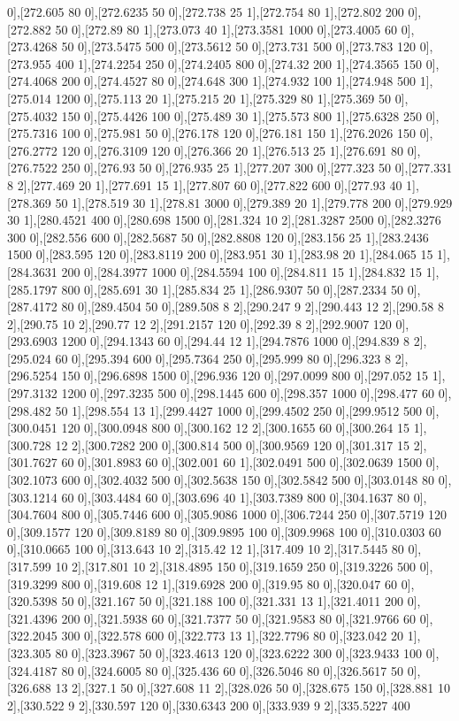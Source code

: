 {0],[272.605 80 0],[272.6235 50 0],[272.738 25 1],[272.754 80 1],[272.802 200 0],[272.882 50 0],[272.89 80 1],[273.073 40 1],[273.3581 1000 0],[273.4005 60 0],[273.4268 50 0],[273.5475 500 0],[273.5612 50 0],[273.731 500 0],[273.783 120 0],[273.955 400 1],[274.2254 250 0],[274.2405 800 0],[274.32 200 1],[274.3565 150 0],[274.4068 200 0],[274.4527 80 0],[274.648 300 1],[274.932 100 1],[274.948 500 1],[275.014 1200 0],[275.113 20 1],[275.215 20 1],[275.329 80 1],[275.369 50 0],[275.4032 150 0],[275.4426 100 0],[275.489 30 1],[275.573 800 1],[275.6328 250 0],[275.7316 100 0],[275.981 50 0],[276.178 120 0],[276.181 150 1],[276.2026 150 0],[276.2772 120 0],[276.3109 120 0],[276.366 20 1],[276.513 25 1],[276.691 80 0],[276.7522 250 0],[276.93 50 0],[276.935 25 1],[277.207 300 0],[277.323 50 0],[277.331 8 2],[277.469 20 1],[277.691 15 1],[277.807 60 0],[277.822 600 0],[277.93 40 1],[278.369 50 1],[278.519 30 1],[278.81 3000 0],[279.389 20 1],[279.778 200 0],[279.929 30 1],[280.4521 400 0],[280.698 1500 0],[281.324 10 2],[281.3287 2500 0],[282.3276 300 0],[282.556 600 0],[282.5687 50 0],[282.8808 120 0],[283.156 25 1],[283.2436 1500 0],[283.595 120 0],[283.8119 200 0],[283.951 30 1],[283.98 20 1],[284.065 15 1],[284.3631 200 0],[284.3977 1000 0],[284.5594 100 0],[284.811 15 1],[284.832 15 1],[285.1797 800 0],[285.691 30 1],[285.834 25 1],[286.9307 50 0],[287.2334 50 0],[287.4172 80 0],[289.4504 50 0],[289.508 8 2],[290.247 9 2],[290.443 12 2],[290.58 8 2],[290.75 10 2],[290.77 12 2],[291.2157 120 0],[292.39 8 2],[292.9007 120 0],[293.6903 1200 0],[294.1343 60 0],[294.44 12 1],[294.7876 1000 0],[294.839 8 2],[295.024 60 0],[295.394 600 0],[295.7364 250 0],[295.999 80 0],[296.323 8 2],[296.5254 150 0],[296.6898 1500 0],[296.936 120 0],[297.0099 800 0],[297.052 15 1],[297.3132 1200 0],[297.3235 500 0],[298.1445 600 0],[298.357 1000 0],[298.477 60 0],[298.482 50 1],[298.554 13 1],[299.4427 1000 0],[299.4502 250 0],[299.9512 500 0],[300.0451 120 0],[300.0948 800 0],[300.162 12 2],[300.1655 60 0],[300.264 15 1],[300.728 12 2],[300.7282 200 0],[300.814 500 0],[300.9569 120 0],[301.317 15 2],[301.7627 60 0],[301.8983 60 0],[302.001 60 1],[302.0491 500 0],[302.0639 1500 0],[302.1073 600 0],[302.4032 500 0],[302.5638 150 0],[302.5842 500 0],[303.0148 80 0],[303.1214 60 0],[303.4484 60 0],[303.696 40 1],[303.7389 800 0],[304.1637 80 0],[304.7604 800 0],[305.7446 600 0],[305.9086 1000 0],[306.7244 250 0],[307.5719 120 0],[309.1577 120 0],[309.8189 80 0],[309.9895 100 0],[309.9968 100 0],[310.0303 60 0],[310.0665 100 0],[313.643 10 2],[315.42 12 1],[317.409 10 2],[317.5445 80 0],[317.599 10 2],[317.801 10 2],[318.4895 150 0],[319.1659 250 0],[319.3226 500 0],[319.3299 800 0],[319.608 12 1],[319.6928 200 0],[319.95 80 0],[320.047 60 0],[320.5398 50 0],[321.167 50 0],[321.188 100 0],[321.331 13 1],[321.4011 200 0],[321.4396 200 0],[321.5938 60 0],[321.7377 50 0],[321.9583 80 0],[321.9766 60 0],[322.2045 300 0],[322.578 600 0],[322.773 13 1],[322.7796 80 0],[323.042 20 1],[323.305 80 0],[323.3967 50 0],[323.4613 120 0],[323.6222 300 0],[323.9433 100 0],[324.4187 80 0],[324.6005 80 0],[325.436 60 0],[326.5046 80 0],[326.5617 50 0],[326.688 13 2],[327.1 50 0],[327.608 11 2],[328.026 50 0],[328.675 150 0],[328.881 10 2],[330.522 9 2],[330.597 120 0],[330.6343 200 0],[333.939 9 2],[335.5227 400 }
